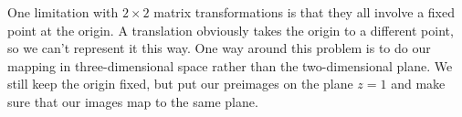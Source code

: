 \documentclass[../textbook.tex]{subfiles}
\begin{document}
\begin{enumerate}
\begin{enumerate}
\begin{multicols}{4}
\item {}
\item {}
\item {}
\item {}
\item {}
\item {}
\item {}
\item {}
\item {}
\item {}
\item {}
\item {}
\end{multicols}
\end{enumerate}
\setcounter{mp_problem_i}{\value{enumi}}
\end{enumerate}

\noindent One limitation with $2\times 2$ matrix transformations is that they all involve a fixed point at the origin. A translation obviously takes the origin to a different point, so we can't represent it this way. One way around this problem is to do our mapping in three-dimensional space rather than the two-dimensional plane. We still keep the origin fixed, but put our preimages on the plane $z=1$ and make sure that our images map to the same plane.
\end{document}
